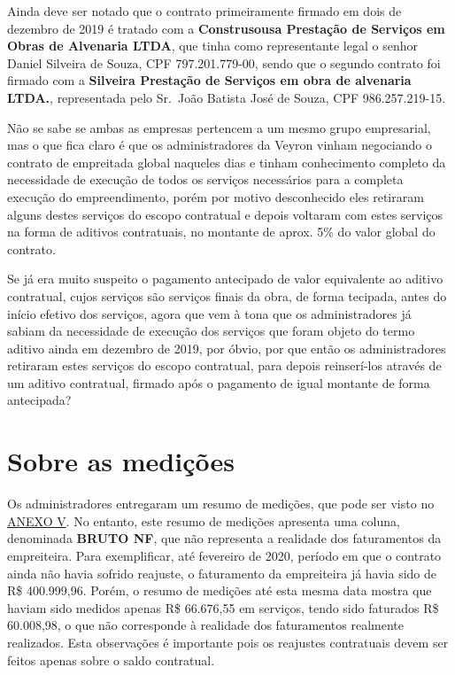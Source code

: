 \documentclass[
  letterpaper,
  DIV=11,
  numbers=noendperiod]{scrreprt}
\begin{document}
Ainda deve ser notado que o contrato primeiramente firmado em dois de
dezembro de 2019 é tratado com a \textbf{Construsousa Prestação de
Serviços em Obras de Alvenaria LTDA}, que tinha como representante legal
o senhor Daniel Silveira de Souza, CPF 797.201.779-00, sendo que o
segundo contrato foi firmado com a \textbf{Silveira Prestação de
Serviços em obra de alvenaria LTDA.}, representada pelo Sr.~João Batista
José de Souza, CPF 986.257.219-15.

Não se sabe se ambas as empresas pertencem a um mesmo grupo empresarial,
mas o que fica claro é que os administradores da Veyron vinham
negociando o contrato de empreitada global naqueles dias e tinham
conhecimento completo da necessidade de execução de todos os serviços
necessários para a completa execução do empreendimento, porém por motivo
desconhecido eles retiraram alguns destes serviços do escopo contratual
e depois voltaram com estes serviços na forma de aditivos contratuais,
no montante de aprox. 5\% do valor global do contrato.

Se já era muito suspeito o pagamento antecipado de valor equivalente ao
aditivo contratual, cujos serviços são serviços finais da obra, de forma
tecipada, antes do início efetivo dos serviços, agora que vem à tona que
os administradores já sabiam da necessidade de execução dos serviços que
foram objeto do termo aditivo ainda em dezembro de 2019, por óbvio, por
que então os administradores retiraram estes serviços do escopo
contratual, para depois reinserí-los através de um aditivo contratual,
firmado após o pagamento de igual montante de forma antecipada?

\section{Sobre as medições}\label{sobre-as-mediuxe7uxf5es}

Os administradores entregaram um resumo de medições, que pode ser visto
no \hyperref[anexo-v]{ANEXO V}. No entanto, este resumo de medições
apresenta uma coluna, denominada \textbf{BRUTO NF}, que não representa a
realidade dos faturamentos da empreiteira. Para exemplificar, até
fevereiro de 2020, período em que o contrato ainda não havia sofrido
reajuste, o faturamento da empreiteira já havia sido de R\$ 400.999,96.
Porém, o resumo de medições até esta mesma data mostra que haviam sido
medidos apenas R\$ 66.676,55 em serviços, tendo sido faturados R\$
60.008,98, o que não corresponde à realidade dos faturamentos realmente
realizados. Esta observações é importante pois os reajustes contratuais
devem ser feitos apenas sobre o saldo contratual.
\end{document}
